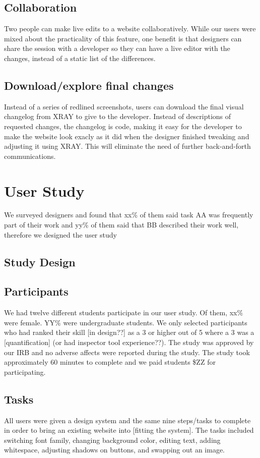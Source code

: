 \documentclass{sigchi}
\newcommand{\xray}{XRAY\xspace}
\begin{document}
\subsection{Collaboration}
Two people can make live edits to a website collaboratively. While our users were mixed about the practicality of this feature, one benefit is that designers can share the session with a developer so they can have a live editor with the changes, instead of a static list of the differences. 

\subsection{Download/explore final changes}
Instead of a series of redlined screenshots, users can download the final visual changelog from \xray to give to the developer. Instead of descriptions of requested changes, the changelog is code, making it easy for the developer to make the website look exacly as it did when the designer finished tweaking and adjusting it using \xray. This will eliminate the need of further back-and-forth communications. 

\section{User Study}
We surveyed designers and found that xx\% of them said task AA was frequently part of their work and yy\% of them said that BB described their work well, therefore we designed the user study 
\subsection{Study Design}

\subsection{Participants}
We had twelve different students participate in our user study. Of them, xx\% were female. YY\% were undergraduate students. We only selected participants who had ranked their skill [in design??] as a 3 or higher out of 5 where a 3 was a [quantification] (or had inspector tool experience??). The study was approved by our IRB and no adverse affects were reported during the study. The study took approximately 60 minutes to complete and we paid students \$ZZ for participating. 


\subsection{Tasks}
All users were given a design system and the same nine steps/tasks to complete in order to bring an existing website into [fitting the system]. The tasks included switching font family, changing background color, editing text, adding whitespace, adjusting shadows on buttons, and swapping out an image. 
\end{document}
